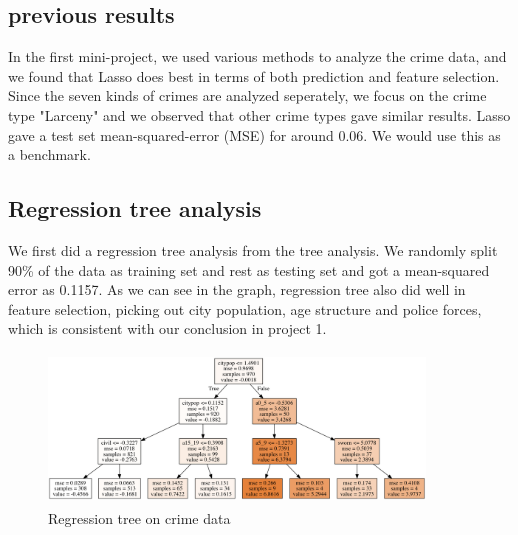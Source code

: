 \documentclass{article}
\begin{document}
\subsection{previous results}
In the first mini-project, we used various methods to analyze the crime data, and we found that Lasso does best in terms of both prediction and feature selection. Since the seven kinds of crimes are analyzed seperately, we focus on the crime type "Larceny" and we observed that other crime types gave similar results. Lasso gave a test set mean-squared-error (MSE) for around 0.06. We would use this as a benchmark.

\subsection{Regression tree analysis}
\label{crime_reg_tree}
We first did a regression tree analysis from the tree analysis. We randomly split 90\% of the data as training set and rest as testing set and got a mean-squared error as 0.1157. As we can see in the graph, regression tree also did well in feature selection, picking out city population, age structure and police forces, which is consistent with our conclusion in project 1.
\begin{figure}[h]
  \centering
  \includegraphics[width=10cm, height=4cm]{crime_treetu}
  \caption{Regression tree on crime data}
\end{figure}
\end{document}
